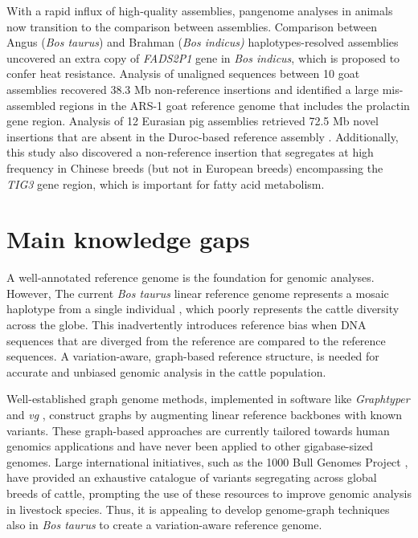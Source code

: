 \documentclass[../main.tex]{subfiles}
\begin{document}
With a rapid influx of high-quality assemblies, pangenome analyses in animals now transition to the comparison between assemblies. Comparison between Angus (\emph{Bos taurus}) and Brahman (\emph{Bos indicus)} haplotypes-resolved assemblies \citep{Low2020} uncovered an extra copy of \emph{FADS2P1} gene in \emph{Bos indicus}, which is proposed to confer heat resistance. Analysis of unaligned sequences between 10 goat assemblies \citep{li2019towards} recovered 38.3 Mb non-reference insertions and identified a large mis-assembled regions in the ARS-1 goat reference genome that includes the prolactin gene region. Analysis of 12 Eurasian pig assemblies retrieved 72.5 Mb novel insertions that are absent in the Duroc-based reference assembly \citep{li2017comprehensive,tian2019building}. Additionally, this study also discovered a non-reference insertion that segregates at high frequency in Chinese breeds (but not in European breeds) encompassing the \emph{TIG3} gene region, which is important for fatty acid metabolism. 


\section{Main knowledge gaps}
\vspace{-1em}
A well-annotated reference genome is the foundation for genomic analyses. However, The current \emph{Bos taurus} linear reference genome represents a mosaic haplotype  from a single individual \citep{rosen2020novo}, which poorly represents the cattle diversity across the globe. This inadvertently introduces reference bias when DNA sequences that are diverged from the reference are compared to the reference sequences. A variation-aware, graph-based reference structure, is needed for accurate and unbiased genomic analysis in the cattle population. 

Well-established graph genome methods, implemented in software like \emph{Graphtyper} \citep{eggertsson2017graphtyper} and \emph{vg} \citep{garrison2018variation}, construct graphs by augmenting linear reference backbones with known variants. These graph-based approaches are currently tailored towards human genomics applications and have never been applied  to other gigabase-sized genomes. Large international initiatives, such as the 1000 Bull Genomes Project \citep{hayes20191000}, have provided an exhaustive catalogue of variants segregating across global breeds of cattle, prompting the use of these resources to improve genomic analysis in livestock species. Thus, it is appealing to develop genome-graph techniques also in \emph{Bos taurus} to create a variation-aware reference genome. 
\end{document}
